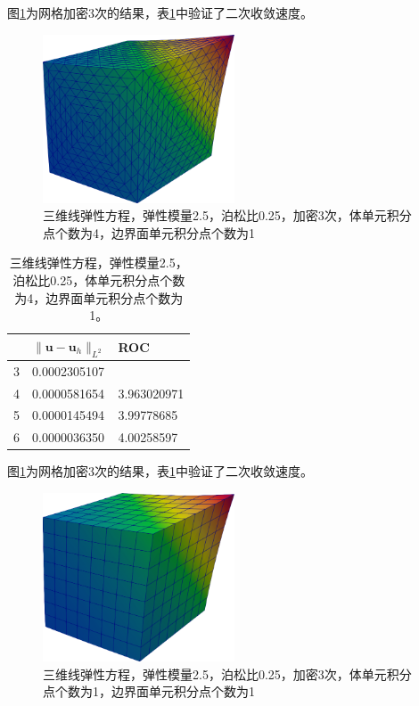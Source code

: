 图\ref{fig:4.1.3:1}为网格加密3次的结果，表\ref{tab:4.1.3:1}中验证了二次收敛速度。

\begin{figure}[!htbp]
  \centering
  \includegraphics[height=5cm]{fig/4/4.1.3:1.png}
  \caption{三维线弹性方程，弹性模量2.5，泊松比0.25，加密3次，体单元积分点个数为4，边界面单元积分点个数为1}
  \label{fig:4.1.3:1}
\end{figure}

\begin{table}[!htbp]
  \centering
  \begin{tabular}{c|l|l}
    & $\|\mathbf u-\mathbf u_h\|_{L^2}$ & ROC\\
    \hline
    3 & 0.0002305107    & \\
    \hline
    4 & 0.0000581654   & 3.963020971  \\
    \hline
    5 & 0.0000145494  &  3.99778685 \\
    \hline
    6 & 0.0000036350 &  4.00258597
  \end{tabular}
  \label{tab:4.1.3:1}
  \caption{三维线弹性方程，弹性模量2.5，泊松比0.25，体单元积分点个数为4，边界面单元积分点个数为1。}
\end{table}

\newpage
图\ref{fig:4.1.3:1}为网格加密3次的结果，表\ref{tab:4.1.3:1}中验证了二次收敛速度。

\begin{figure}[!htbp]
  \centering
  \includegraphics[height=5cm]{fig/4/4.1.3:2.png}
  \caption{三维线弹性方程，弹性模量2.5，泊松比0.25，加密3次，体单元积分点个数为1，边界面单元积分点个数为1}
  \label{fig:4.1.3:2}
\end{figure}

